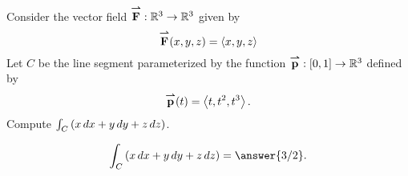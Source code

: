 \documentclass{ximera}
\author{Jim Fowler}
\begin{document}
\begin{exercise}
  Consider the vector field ${\overset{\boldsymbol{\rightharpoonup}}{\mathbf{F}}} : \mathbb R^3 \to \mathbb R^3$ given by
  \[
    {\overset{\boldsymbol{\rightharpoonup}}{\mathbf{F}}}(x,y,z) = \left\langle x,y,z\right\rangle
  \]
  Let $C$ be the line segment parameterized by the function ${\overset{\boldsymbol{\rightharpoonup}}{\mathbf{p}}} : [0,1] \to \mathbb R^3$ defined by
  \[
    {\overset{\boldsymbol{\rightharpoonup}}{\mathbf{p}}}(t) = \left\langle t,t^2,t^3\right\rangle.
  \]
  Compute $\int_C \left( x \mathop{}\!d x + y \mathop{}\!d y + z \mathop{}\!d z \right)$.
  \begin{prompt}
    \[
      \int_C \left( x \d x + y \d y + z \d z \right) = \answer{3/2}.
    \]
\end{prompt}

\end{exercise}
\end{document}
